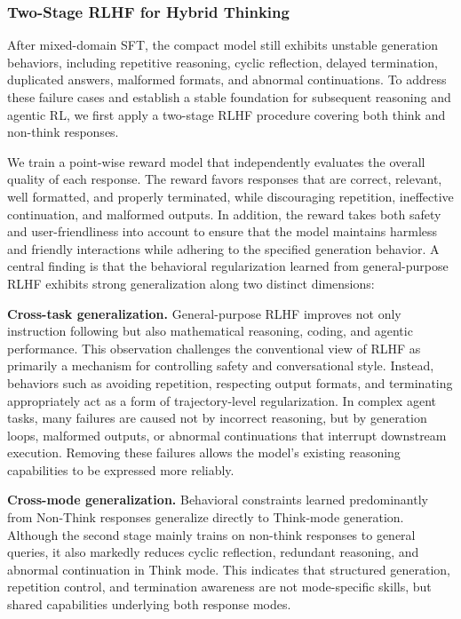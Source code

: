 \subsubsection{Two-Stage RLHF for Hybrid Thinking}

After mixed-domain SFT, the compact model still exhibits unstable generation behaviors, including repetitive reasoning, cyclic reflection, delayed termination, duplicated answers, malformed formats, and abnormal continuations. To address these failure cases and establish a stable foundation for subsequent reasoning and agentic RL, we first apply a two-stage RLHF procedure covering both think and non-think responses. 

We train a point-wise reward model that independently evaluates the overall
quality of each response. 
The reward favors responses that are correct, relevant, well formatted, and
properly terminated, while discouraging repetition, ineffective continuation,
and malformed outputs. In addition, the reward takes both safety and user-friendliness into account to ensure that the model maintains harmless and friendly interactions while adhering to the specified generation behavior.
A central finding is that the behavioral regularization learned
from general-purpose RLHF exhibits strong generalization along two distinct
dimensions:

\textbf{Cross-task generalization.}
General-purpose RLHF improves not only instruction following but also
mathematical reasoning, coding, and agentic performance. This observation
challenges the conventional view of RLHF as primarily a mechanism for
controlling safety and conversational style. Instead, behaviors such as
avoiding repetition, respecting output formats, and terminating appropriately
act as a form of trajectory-level regularization. In complex agent tasks, many
failures are caused not by incorrect reasoning, but by generation loops,
malformed outputs, or abnormal continuations that interrupt downstream
execution. Removing these failures allows the model's existing reasoning
capabilities to be expressed more reliably.

\textbf{Cross-mode generalization.}
Behavioral constraints learned predominantly from Non-Think responses generalize
directly to Think-mode generation. Although the second stage mainly trains on non-think responses to general queries, it also markedly
reduces cyclic reflection, redundant reasoning, and abnormal continuation in
Think mode. This indicates that structured generation, repetition control, and
termination awareness are not mode-specific skills, but shared capabilities
underlying both response modes. 

